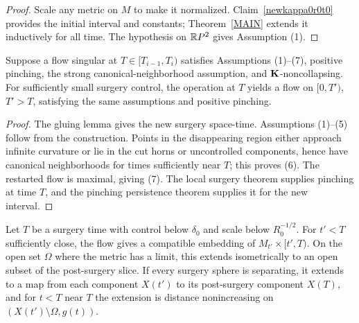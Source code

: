 \begin{proof}
\sketch
{}
Scale any metric on $M$ to make it normalized. Claim~\ref{newkappa0r0t0}
provides the initial interval and constants; Theorem~\ref{MAIN} extends it
inductively for all time. The hypothesis on $\mathbb{R} P^2$ gives Assumption (1).
\end{proof}

\begin{lemma}
\label{lem:surgery-preserves-assumptions-pinching}
\label{14.26}
Suppose a flow singular at $T\in[T_{i-1},T_i)$ satisfies Assumptions (1)--(7),
positive pinching, the strong canonical-neighborhood assumption, and
${\bf K}$-noncollapsing. For sufficiently small surgery control, the operation
at $T$ yields a flow on $[0,T')$, $T'>T$, satisfying the same assumptions and
positive pinching.
\end{lemma}

\begin{proof}
\sketch
{}
The gluing lemma gives the new surgery space-time. Assumptions (1)--(5) follow
from the construction. Points in the disappearing region either approach
infinite curvature or lie in the cut horns or uncontrolled components, hence
have canonical neighborhoods for times sufficiently near $T$; this proves (6).
The restarted flow is maximal, giving (7). The local surgery theorem supplies
pinching at time $T$, and the pinching persistence theorem supplies it for the
new interval.
\end{proof}

\begin{proposition}
\label{prop:surgery-distance-decreasing}

\label{surgerydist}
Let $T$ be a surgery time with control below $\delta_0$ and scale below
$R_0^{-1/2}$. For $t'<T$ sufficiently close, the flow gives a compatible
embedding of $M_{t'}\times[t',T)$. On the open set $\Omega$ where the metric
has a limit, this extends isometrically to an open subset of the post-surgery
slice. If every surgery sphere is separating, it extends to a map from each
component $X(t')$ to its post-surgery component $X(T)$, and for $t<T$ near $T$
the extension is distance nonincreasing on
$(X(t')\setminus\Omega,g(t))$.
\end{proposition}

